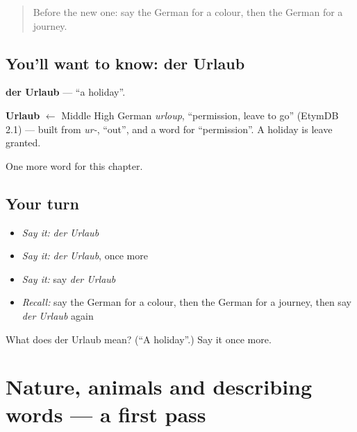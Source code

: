 \label{lesson:GE-C103-urlaub}



\begin{quote}
Before the new one: say the German for a colour, then the German for a journey.
\end{quote}

\subsection*{You'll want to know: der Urlaub}
\textbf{der Urlaub} — \textquotedblleft{}a holiday\textquotedblright{}.

\begin{cousinweb}
\textbf{Urlaub} $\leftarrow$ Middle High German \emph{urloup}, \textquotedblleft{}permission, leave to go\textquotedblright{} (EtymDB 2.1) — built from \emph{ur-}, \textquotedblleft{}out\textquotedblright{}, and a word for \textquotedblleft{}permission\textquotedblright{}. A holiday is leave granted.
\end{cousinweb}

\begin{grammarlens}[title={What you've built}]
One more word for this chapter.
\end{grammarlens}

\subsection*{Your turn}
\begin{itemize}
\raggedright
  \item \emph{Say it:} \emph{der Urlaub}
  \item \emph{Say it:} \emph{der Urlaub}, once more
  \item \emph{Say it:} say \emph{der Urlaub}
  \item \emph{Recall:} say the German for a colour, then the German for a journey, then say \emph{der Urlaub} again
\end{itemize}

\begin{tcolorbox}[breakable,colback=teal!4,colframe=teal!35!black,title={Before you move on}]
What does der Urlaub mean? (\textquotedblleft{}A holiday\textquotedblright{}.) Say it once more.
\end{tcolorbox}
\section[(dialogue)]{Nature, animals and describing words — a first pass}

